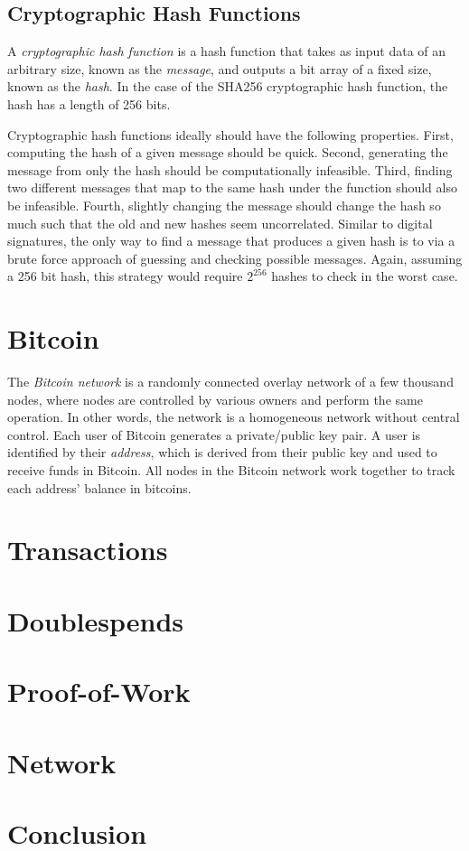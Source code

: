 \documentclass{article}
\begin{document}
\subsection{Cryptographic Hash Functions}

A \emph{cryptographic hash function} is a hash function that takes as input data
of an arbitrary size, known as the \emph{message}, and outputs a bit array of a
fixed size, known as the \emph{hash}. In the case of the SHA256 cryptographic
hash function, the hash has a length of 256 bits.

Cryptographic hash functions ideally should have the following properties.
First, computing the hash of a given message should be quick. Second, generating
the message from only the hash should be computationally infeasible. Third,
finding two different messages that map to the same hash under the function
should also be infeasible. Fourth, slightly changing the message should change
the hash so much such that the old and new hashes seem uncorrelated. Similar to
digital signatures, the only way to find a message that produces a given hash is
to via a brute force approach of guessing and checking possible messages. Again,
assuming a 256 bit hash, this strategy would require $2^{256}$ hashes to check
in the worst case.

\section{Bitcoin}

The \emph{Bitcoin network} is a randomly connected overlay network of a few
thousand nodes, where nodes are controlled by various owners and perform the
same operation. In other words, the network is a homogeneous network without
central control. Each user of Bitcoin generates a private/public key pair. A
user is identified by their \emph{address}, which is derived from their public
key and used to receive funds in Bitcoin. All nodes in the Bitcoin network work
together to track each address' balance in bitcoins.

\section{Transactions}

\section{Doublespends}

\section{Proof-of-Work}

\section{Network}

\section{Conclusion}
\end{document}
